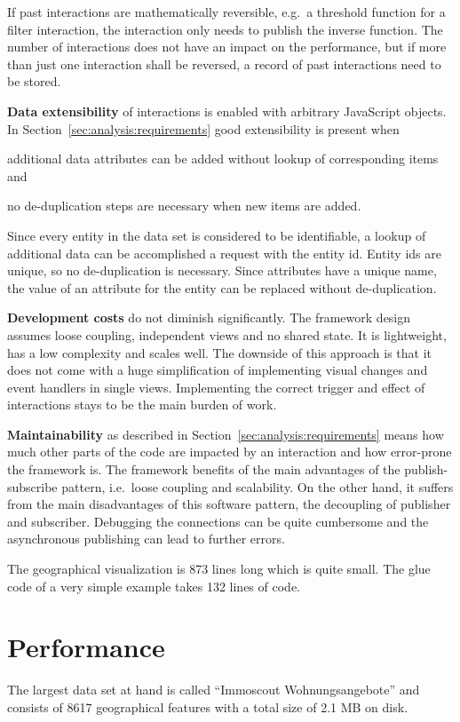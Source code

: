 If past interactions are mathematically reversible, e.g.\ a threshold function for a filter interaction, the  interaction only needs to publish the inverse function.
The number of interactions does not have an impact on the performance, but if more than just one interaction shall be reversed, a record of past interactions need to be stored.

\textbf{Data extensibility} of interactions is enabled with arbitrary JavaScript objects.
In Section~\ref{sec:analysis:requirements} good extensibility is present when
\begin{enumerate*}[label=(\arabic*)]
  \item
    additional data attributes can be added without lookup of corresponding items and
  \item
    no de-duplication steps are necessary when new items are added.
\end{enumerate*}
Since every entity in the data set is considered to be identifiable, a lookup of additional data can be accomplished a request with the entity id.
Entity ids are unique, so no de-duplication is necessary.
Since attributes have a unique name, the value of an attribute for the entity can be replaced without de-duplication.

\textbf{Development costs} do not diminish significantly.
The framework design assumes loose coupling, independent views and no shared state.
It is lightweight, has a low complexity and scales well.
The downside of this approach is that it does not come with a huge simplification of implementing visual changes and event handlers in single views.
Implementing the correct trigger and effect of interactions stays to be the main burden of work.

\textbf{Maintainability} as described in Section~\ref{sec:analysis:requirements} means how much other parts of the code are impacted by an interaction and how error-prone the framework is.
The framework benefits of the main advantages of the publish-subscribe pattern, i.e.\ loose coupling and scalability.
On the other hand, it suffers from the main disadvantages of this software pattern, the decoupling of publisher and subscriber.
Debugging the connections can be quite cumbersome and the asynchronous publishing can lead to further errors.

The geographical visualization is 873 lines long which is quite small.
The glue code of a very simple example takes 132 lines of code.


\section{Performance}
The largest data set at hand is called ``Immoscout Wohnungsangebote'' and consists of 8617 geographical features with a total size of 2.1 MB on disk.
